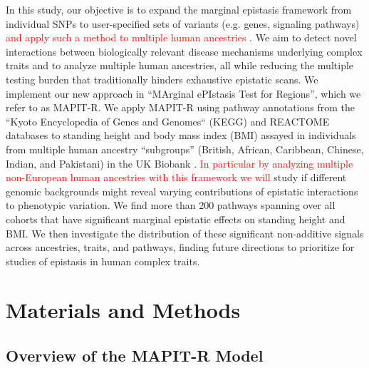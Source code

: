 \documentclass[10pt]{article}
\begin{document}
In this study, our objective is to expand the marginal epistasis framework from individual SNPs to user-specified sets of variants (e.g. genes, signaling pathways) \textcolor{red}{and apply such a method to multiple human ancestries} . We aim to detect novel interactions between biologically relevant disease mechanisms underlying complex traits and to analyze multiple human ancestries, all while reducing the multiple testing burden that traditionally hinders exhaustive epistatic scans. We implement our new approach in ``MArginal ePIstasis Test for Regions'', which we refer to as MAPIT-R. We apply MAPIT-R using pathway annotations from the ``Kyoto Encyclopedia of Genes and Genomes`` (KEGG) and REACTOME databases \cite{Liberzon2011} to standing height and body mass index (BMI) assayed in individuals from multiple human ancestry ``subgroups'' (British, African, Caribbean, Chinese, Indian, and Pakistani) in the UK Biobank \cite{Sudlow2015}. \textcolor{red}{In particular by analyzing multiple non-European human ancestries with this framework we will} study if different genomic backgrounds might reveal varying contributions of epistatic interactions to phenotypic variation. We find more than 200 pathways spanning over all cohorts that have significant marginal epistatic effects on standing height and BMI. We then investigate the distribution of these significant non-additive signals across ancestries, traits, and pathways, finding future directions to prioritize for studies of epistasis in human complex traits.


\section*{Materials and Methods} 

\subsection*{Overview of the MAPIT-R Model}
\end{document}
